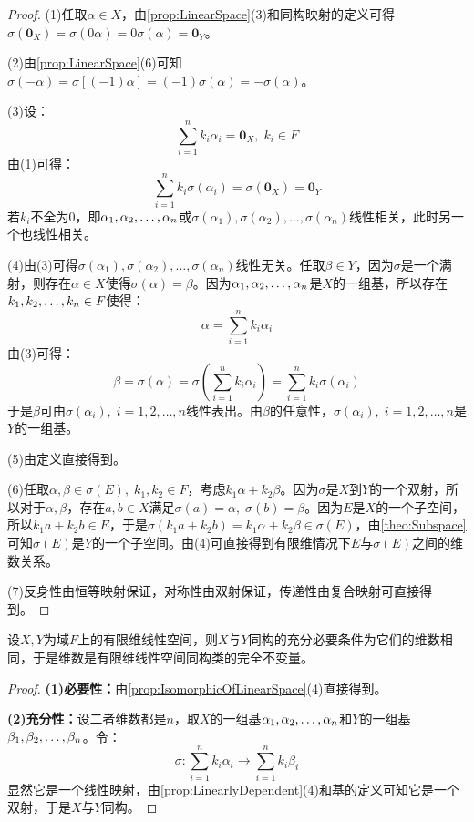 \begin{proof}
	(1)任取$\alpha\in X$，由\cref{prop:LinearSpace}(3)和同构映射的定义可得$\sigma(\mathbf{0}_X)=\sigma(0\alpha)=0\sigma(\alpha)=\mathbf{0}_Y$。\par
	(2)由\cref{prop:LinearSpace}(6)可知$\sigma(-\alpha)=\sigma[(-1)\alpha]=(-1)\sigma(\alpha)=-\sigma(\alpha)$。\par
	(3)设：
	\begin{equation*}
		\sum_{i=1}^{n}k_i\alpha_i=\mathbf{0}_X,\;k_i\in F
	\end{equation*}
	由(1)可得：
	\begin{equation*}
		\sum_{i=1}^{n}k_i\sigma(\alpha_i)=\sigma(\mathbf{0}_X)=\mathbf{0}_Y
	\end{equation*}
	若$k_i$不全为$0$，即$\alpha_1, \alpha_2, \dots, \alpha_{n}$或$\sigma(\alpha_1),\sigma(\alpha_2),\dots,\sigma(\alpha_n)$线性相关，此时另一个也线性相关。\par
	(4)由(3)可得$\sigma(\alpha_1),\sigma(\alpha_2),\dots,\sigma(\alpha_n)$线性无关。任取$\beta\in Y$，因为$\sigma$是一个满射，则存在$\alpha\in X$使得$\sigma(\alpha)=\beta$。因为$\alpha_1, \alpha_2, \dots, \alpha_{n}$是$X$的一组基，所以存在$k_1, k_2, \dots, k_{n}\in F$使得：
	\begin{equation*}
		\alpha=\sum_{i=1}^{n}k_i\alpha_i
	\end{equation*}
	由(3)可得：
	\begin{equation*}
		\beta=\sigma(\alpha)=\sigma\left(\sum_{i=1}^{n}k_i\alpha_i\right)=\sum_{i=1}^{n}k_i\sigma(\alpha_i)
	\end{equation*}
	于是$\beta$可由$\sigma(\alpha_i),\;i=1,2,\dots,n$线性表出。由$\beta$的任意性，$\sigma(\alpha_i),\;i=1,2,\dots,n$是$Y$的一组基。\par
	(5)由定义直接得到。\par
	(6)任取$\alpha,\beta\in\sigma(E),\;k_1,k_2\in F$，考虑$k_1\alpha+k_2\beta$。因为$\sigma$是$X$到$Y$的一个双射，所以对于$\alpha,\beta$，存在$a,b\in X$满足$\sigma(a)=\alpha,\;\sigma(b)=\beta$。因为$E$是$X$的一个子空间，所以$k_1a+k_2b\in E$，于是$\sigma(k_1a+k_2b)=k_1\alpha+k_2\beta\in\sigma(E)$，由\cref{theo:Subspace}可知$\sigma(E)$是$Y$的一个子空间。由(4)可直接得到有限维情况下$E$与$\sigma(E)$之间的维数关系。\par
	(7)反身性由恒等映射保证，对称性由双射保证，传递性由复合映射可直接得到。
\end{proof}
\begin{theorem}\label{theo:IsomorphicDim}
	设$X,Y$为域$F$上的有限维线性空间，则$X$与$Y$同构的充分必要条件为它们的维数相同，于是维数是有限维线性空间同构类的完全不变量。
\end{theorem}
\begin{proof}
	\textbf{(1)必要性：}由\cref{prop:IsomorphicOfLinearSpace}(4)直接得到。\par
	\textbf{(2)充分性：}设二者维数都是$n$，取$X$的一组基$\alpha_1, \alpha_2, \dots, \alpha_{n}$和$Y$的一组基$\beta_1, \beta_2, \dots, \beta_{n}$。令：
	\begin{equation*}
		\sigma:\sum_{i=1}^{n}k_i\alpha_i\longrightarrow\sum_{i=1}^{n}k_i\beta_i
	\end{equation*}
	显然它是一个线性映射，由\cref{prop:LinearlyDependent}(4)和基的定义可知它是一个双射，于是$X$与$Y$同构。
\end{proof}

